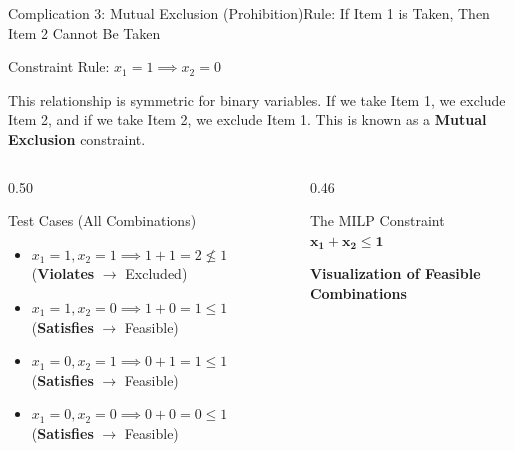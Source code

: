\documentclass[aspectratio=169]{beamer}
\newenvironment{constraintblock}[1]{
    \begin{block}{Constraint Rule: #1}
    \vspace{-0.3em}
}{
    \end{block}
}
\begin{document}
\begin{frame}{Complication 3: Mutual Exclusion (Prohibition)}{Rule: If Item 1 is Taken, Then Item 2 Cannot Be Taken}
    \begin{constraintblock}{$x_1 = 1 \implies x_2 = 0$}
        This relationship is symmetric for binary variables. If we take Item 1, we exclude Item 2, and if we take Item 2, we exclude Item 1. This is known as a \textbf{Mutual Exclusion} constraint.
    \end{constraintblock}

    \begin{columns}[T]
        \begin{column}{0.50\textwidth}
            \begin{alertblock}{Test Cases (All Combinations)}
            \footnotesize
                \begin{itemize}
                    \item $x_1=1, x_2=1 \implies 1+1 = 2 \not\le 1$ (\textbf{Violates} $\rightarrow$ \alert{Excluded})
                    \item $x_1=1, x_2=0 \implies 1+0 = 1 \le 1$ (\textbf{Satisfies} $\rightarrow$ Feasible)
                    \item $x_1=0, x_2=1 \implies 0+1 = 1 \le 1$ (\textbf{Satisfies} $\rightarrow$ Feasible)
                    \item $x_1=0, x_2=0 \implies 0+0 = 0 \le 1$ (\textbf{Satisfies} $\rightarrow$ Feasible)
                \end{itemize}
            \end{alertblock}
        \end{column}
        \begin{column}{0.46\textwidth}
            \begin{block}{The MILP Constraint}
                \centering $\mathbf{x_1 + x_2 \le 1}$
            \end{block}
            \centering
            \footnotesize \textbf{Visualization of Feasible Combinations}\\[2pt]
\end{column}
\end{columns}
\end{frame}
\end{document}
